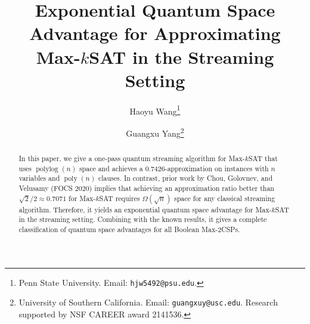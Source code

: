\documentclass[11pt]{article}
\title{Exponential Quantum Space Advantage for Approximating Max-$k$SAT in the Streaming Setting}
\author{
Haoyu Wang\thanks{Penn State University. Email: \texttt{hjw5492@psu.edu}.}\\
\and
Guangxu Yang\thanks{University of Southern California. Email: \texttt{guangxuy@usc.edu}. Research supported by NSF CAREER award 2141536.}\\
}
\theoremstyle{definition}
\newcommand{\1}{\mathbf 1}
\begin{document}
\date{}
\maketitle

\begin{abstract}
In this paper, we give a one-pass quantum streaming algorithm for Max-$k$SAT that uses $\operatorname{polylog}(n)$ space and achieves a $0.7426$-approximation on instances with $n$ variables and $\operatorname{poly}(n)$ clauses. In contrast, prior work by Chou, Golovnev, and Velusamy (FOCS 2020) implies that achieving an approximation ratio better than $\sqrt{2}/2 \approx 0.7071$ for Max-$k$SAT requires $\Omega(\sqrt{n})$ space for any classical streaming algorithm. Therefore, it yields an exponential quantum space advantage for Max-$k$SAT in the streaming setting. Combining with the known results, it gives a complete classification of quantum space advantages for all Boolean Max-2CSPs. 

\end{abstract}
\newpage
\tableofcontents













\end{document}
